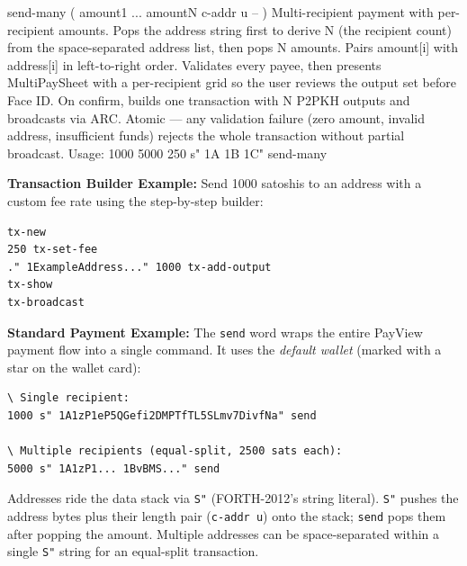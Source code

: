 \documentclass[a4paper, 11pt, openany]{book}
\begin{document}
\begin{forthbox}
  send-many       ( amount1 ... amountN c-addr u -- )
                  Multi-recipient payment with per-recipient
                  amounts. Pops the address string first to
                  derive N (the recipient count) from the
                  space-separated address list, then pops N
                  amounts. Pairs amount[i] with address[i]
                  in left-to-right order. Validates every
                  payee, then presents MultiPaySheet with a
                  per-recipient grid so the user reviews the
                  output set before Face ID. On confirm, builds
                  one transaction with N P2PKH outputs and
                  broadcasts via ARC. Atomic --- any validation
                  failure (zero amount, invalid address,
                  insufficient funds) rejects the whole
                  transaction without partial broadcast.
                  Usage: 1000 5000 250 s" 1A 1B 1C" send-many
\end{forthbox}

\begin{notebox}
\textbf{Transaction Builder Example:} Send 1000 satoshis to an address with a custom fee rate using the step-by-step builder:
\begin{lstlisting}
tx-new
250 tx-set-fee
." 1ExampleAddress..." 1000 tx-add-output
tx-show
tx-broadcast
\end{lstlisting}
\end{notebox}

\begin{notebox}
\textbf{Standard Payment Example:} The \texttt{send} word wraps the entire PayView payment flow into a single command. It uses the \emph{default wallet} (marked with a star on the wallet card):
\begin{lstlisting}
\ Single recipient:
1000 s" 1A1zP1eP5QGefi2DMPTfTL5SLmv7DivfNa" send

\ Multiple recipients (equal-split, 2500 sats each):
5000 s" 1A1zP1... 1BvBMS..." send
\end{lstlisting}
Addresses ride the data stack via \texttt{S"} (FORTH-2012's string literal). \texttt{S"} pushes the address bytes plus their length pair (\texttt{c-addr u}) onto the stack; \texttt{send} pops them after popping the amount. Multiple addresses can be space-separated within a single \texttt{S"} string for an equal-split transaction.
\end{notebox}
\end{document}
